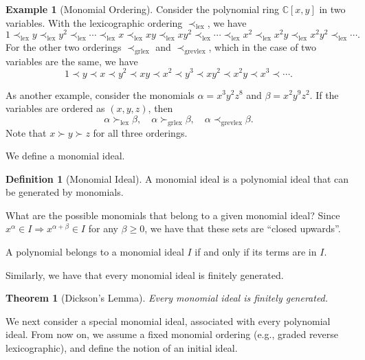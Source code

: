 \documentclass[
]{book}
\newtheorem{theorem}{Theorem}[chapter]
\theoremstyle{definition}
\newtheorem{definition}{Definition}[chapter]
\theoremstyle{definition}
\newtheorem{example}{Example}[chapter]
\theoremstyle{definition}
\theoremstyle{definition}
\theoremstyle{remark}
\begin{document}
\begin{example}[Monomial Ordering]
\protect\hypertarget{exm:MonomialOrdering}{}\label{exm:MonomialOrdering}Consider the polynomial ring \(\mathbb{C}[x,y]\) in two variables. With the lexicographic ordering \(\prec_{\mathrm{lex}}\), we have
\[
1 \prec_{\mathrm{lex}}y \prec_{\mathrm{lex}}y^2 \prec_{\mathrm{lex}}\cdots \prec_{\mathrm{lex}}x \prec_{\mathrm{lex}}xy \prec_{\mathrm{lex}}xy^2 \prec_{\mathrm{lex}}\cdots \prec_{\mathrm{lex}}x^2 \prec_{\mathrm{lex}}x^2 y \prec_{\mathrm{lex}}x^2 y^2 \prec_{\mathrm{lex}}\cdots.
\]
For the other two orderings \(\prec_{\mathrm{grlex}}\) and \(\prec_{\mathrm{grevlex}}\), which in the case of two variables are the same, we have
\[
1 \prec y \prec x \prec y^2 \prec xy \prec x^2 \prec y^3 \prec xy^2 \prec x^2 y \prec x^3 \prec \cdots.
\]

As another example, consider the monomials \(\alpha = x^3 y^2 z^8\) and \(\beta = x^2 y^9 z^2\). If the variables are ordered as \((x,y,z)\), then
\[
\alpha \succ_{\mathrm{lex}}\beta, \quad \alpha \succ_{\mathrm{grlex}}\beta, \quad \alpha \prec_{\mathrm{grevlex}}\beta.
\]
Note that \(x \succ y \succ z\) for all three orderings.
\end{example}

We define a monomial ideal.

\begin{definition}[Monomial Ideal]
\protect\hypertarget{def:MonomialIdeal}{}\label{def:MonomialIdeal}A monomial ideal is a polynomial ideal that can be generated by monomials.
\end{definition}

What are the possible monomials that belong to a given monomial ideal? Since \(x^\alpha \in I \Rightarrow x^{\alpha + \beta} \in I\) for any \(\beta \geq 0\), we have that these sets are ``closed upwards''.

A polynomial belongs to a monomial ideal \(I\) if and only if its terms are in \(I\).

Similarly, we have that every monomial ideal is finitely generated.

\begin{theorem}[Dickson's Lemma]
\protect\hypertarget{thm:Dickson}{}\label{thm:Dickson}Every monomial ideal is finitely generated.
\end{theorem}

We next consider a special monomial ideal, associated with every polynomial ideal. From now on, we assume a fixed monomial ordering (e.g., graded reverse lexicographic), and define the notion of an initial ideal.
\end{document}
